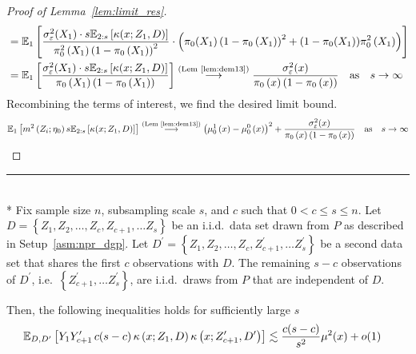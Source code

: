 \begin{proof}[Proof of Lemma~\ref{lem:limit_res}]
\begin{equation}
\begin{aligned}
			 & = \mathbb{E}_{1}\left[\frac{\sigma_{\varepsilon}^2(X_1) \cdot s \mathbb{E}_{2:s}\left[\kappa(x; Z_1, D)\right]}{\pi_{0}^2\left(X_1\right)\left(1 - \pi_{0}\left(X_1\right)\right)^2} \cdot
			\left(\pi_{0}(X_1)\left(1 - \pi_{0}\left(X_1\right)\right)^2 + (1 - \pi_{0}(X_1))\pi_{0}^2\left(X_1\right) \right)\right]                                                             \\
			 & = \mathbb{E}_{1}\left[\frac{\sigma_{\varepsilon}^2(X_1) \cdot s \mathbb{E}_{2:s}\left[\kappa(x; Z_1, D)\right]}{\pi_{0}\left(X_1\right)\left(1 - \pi_{0}\left(X_1\right)\right)}\right]
			\overset{\text{(Lem~\ref{lem:dem13})}}{\longrightarrow} \frac{\sigma_{\varepsilon}^2(x)}{\pi_{0}\left(x\right)\left(1 - \pi_{0}\left(x\right)\right)}
			\quad \text{as} \quad s \rightarrow \infty
		\end{aligned}
	\end{equation}
	Recombining the terms of interest, we find the desired limit bound.
	\begin{equation}
		\begin{aligned}
			\mathbb{E}_{1}\left[m^2\left(Z_{i}; \eta_{0}\right) s \mathbb{E}_{2:s}\left[\kappa(x; Z_1, D)\right]\right]
			\overset{\text{(Lem~\ref{lem:dem13})}}{\longrightarrow} \left(\mu_{0}^{1}\left(x\right) - \mu_{0}^{0}\left(x\right)\right)^2 + \frac{\sigma_{\varepsilon}^2(x)}{\pi_{0}\left(x\right)\left(1 - \pi_{0}\left(x\right)\right)}
			\quad \text{as} \quad s \rightarrow \infty
		\end{aligned}
	\end{equation}
\end{proof}

\hrule

\begin{lem}\label{lem:npr_kern_ineq1}\mbox{}\\*
	Fix sample size $n$, subsampling scale $s$, and $c$ such that $0 < c \leq s \leq n$.
	Let $D = \left\{Z_1, Z_2, \dotsc, Z_c, Z_{c+1}, \dotsc Z_s \right\}$ be an i.i.d.\ data set drawn from $P$ as described in Setup~\ref{asm:npr_dgp}.
	Let $D^{\prime} = \left\{Z_1, Z_2, \dotsc, Z_c, Z_{c+1}^{\prime}, \dotsc Z_s^{\prime} \right\}$ be a second data set that shares the first $c$ observations with $D$.
	The remaining $s - c$ observations of $D^{\prime}$, i.e.\ $\left\{Z_{c+1}^{\prime}, \dotsc Z_s^{\prime} \right\}$, are i.i.d.\ draws from $P$ that are independent of $D$.

	Then, the following inequalities holds for sufficiently large $s$
	\begin{equation}
		\begin{aligned}
			\mathbb{E}_{D, D^{\prime}}\left[Y_{1}Y_{c+1}^{\prime} \, c(s-c) \, \kappa\left(x; Z_{1}, D\right)\kappa\left(x; Z_{c+1}^{\prime}, D^{\prime}\right)\right]
			& \lesssim  \frac{c(s-c)}{s^2}\mu^2(x) + o(1) 	
		\end{aligned}
	\end{equation}
\end{lem}

